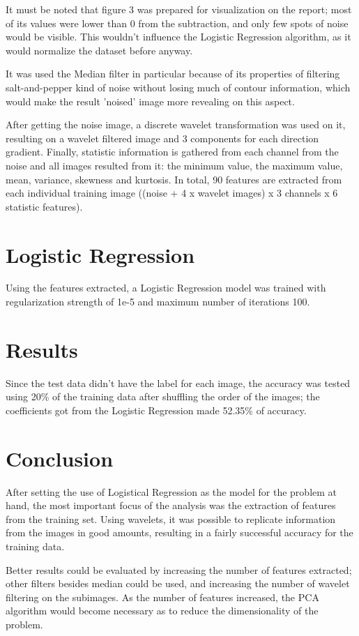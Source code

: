 \documentclass[10pt,twocolumn,letterpaper]{article}
\begin{document}
It must be noted that figure 3 was prepared for visualization on the report; most of its values were lower than 0 from the subtraction, and only few spots of noise would be visible. This wouldn't influence the Logistic Regression algorithm, as it would normalize the dataset before anyway.

It was used the Median filter in particular because of its properties of filtering salt-and-pepper kind of noise without losing much of contour information, which would make the result 'noised' image more revealing on this aspect.

After getting the noise image, a discrete wavelet transformation was used on it, resulting on a wavelet filtered image and 3 components for each direction gradient. Finally, statistic information is gathered from each channel from the noise and all images resulted from it: the minimum value, the maximum value, mean, variance, skewness and kurtosis. In total, 90 features are extracted from each individual training image ((noise + 4 x wavelet images) x 3 channels x 6 statistic features).

\section{Logistic Regression}
Using the features extracted, a Logistic Regression model was trained with regularization strength of 1e-5 and maximum number of iterations 100.

\section{Results}
Since the test data didn't have the label for each image, the accuracy was tested using 20\% of the training data after shuffling the order of the images; the coefficients got from the Logistic Regression made 52.35\% of accuracy.

\section{Conclusion}

After setting the use of Logistical Regression as the model for the problem at hand, the most important focus of the analysis was the extraction of features from the training set. Using wavelets, it was possible to replicate information from the images in good amounts, resulting in a fairly successful accuracy for the training data.

Better results could be evaluated by increasing the number of features extracted; other filters besides median could be used, and increasing the number of wavelet filtering on the subimages. As the number of features increased, the PCA algorithm would become necessary as to reduce the dimensionality of the problem.

\end{document}
